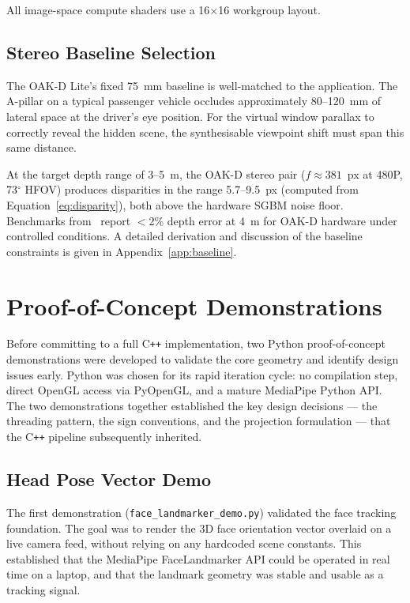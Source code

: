 \documentclass[11pt, a4paper]{report}
\begin{document}
All image-space compute shaders use a 16$\times$16 workgroup layout.

\section{Stereo Baseline Selection}
\label{sec:baseline}

The OAK-D Lite's fixed 75~mm baseline is well-matched to the
application.
The A-pillar on a typical passenger vehicle occludes approximately
80--120~mm of lateral space at the driver's eye position.
For the virtual window parallax to correctly reveal the hidden scene,
the synthesisable viewpoint shift must span this same distance.

At the target depth range of 3--5~m, the OAK-D stereo pair
($f \approx 381$~px at 480P, 73$^\circ$ HFOV) produces disparities in
the range 5.7--9.5~px (computed from Equation~\ref{eq:disparity}),
both above the hardware SGBM noise floor.
Benchmarks from~\cite{arxiv2501} report $<$2\% depth error at 4~m for
OAK-D hardware under controlled conditions.
A detailed derivation and discussion of the baseline constraints is given
in Appendix~\ref{app:baseline}.

\chapter{Proof-of-Concept Demonstrations}

Before committing to a full C\texttt{++} implementation, two Python
proof-of-concept demonstrations were developed to validate the core
geometry and identify design issues early.
Python was chosen for its rapid iteration cycle: no compilation step,
direct OpenGL access via PyOpenGL, and a mature MediaPipe Python API.
The two demonstrations together established the key design decisions ---
the threading pattern, the sign conventions, and the projection
formulation --- that the C\texttt{++} pipeline subsequently inherited.

\section{Head Pose Vector Demo}

The first demonstration (\texttt{face\_landmarker\_demo.py}) validated
the face tracking foundation.
The goal was to render the 3D face orientation vector overlaid on a live
camera feed, without relying on any hardcoded scene constants.
This established that the MediaPipe FaceLandmarker API could be operated
in real time on a laptop, and that the landmark geometry was stable and
usable as a tracking signal.
\end{document}
